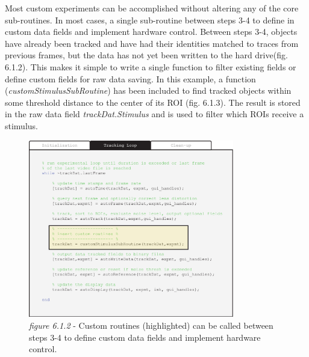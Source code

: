 \documentclass[11pt]{article}
\begin{document}
Most custom experiments can be accomplished without altering any of the core sub-routines. In most cases, a single sub-routine between steps 3-4 to define in custom data fields and implement hardware control. Between steps 3-4, objects have already been tracked and have had their identities matched to traces from previous frames, but the data has not yet been written to the hard drive(fig. 6.1.2). This makes it simple to write a single function to filter existing fields or define custom fields for raw data saving. In this example, a function (\textit{customStimulusSubRoutine}) has been included to find tracked objects within some threshold distance to the center of its ROI (fig. 6.1.3). The result is stored in the raw data field \textit{trackDat.Stimulus} and is used to filter which ROIs receive a stimulus.  

\begin{figure}[h!]
	\begin{center}
		\includegraphics[width=0.8\textwidth]{images/custom_exp/tracking_loop.pdf}
		\caption*{\footnotesize {\textit{figure 6.1.2} - Custom routines (highlighted) can be called between steps 3-4 to define custom data fields and implement hardware control.}}
	\end{center}
\end{figure}
\end{document}

